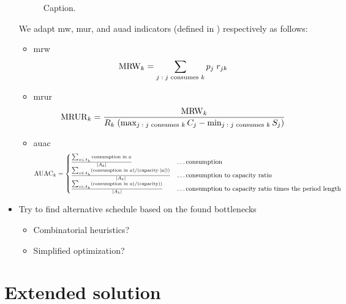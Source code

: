 \begin{itemize}
\begin{figure}[t]
      \caption{Caption.}
      \label{fig:MachineLoad}
    \end{figure}

    We adapt \ac{mw}, \ac{mur}, and \ac{auad} indicators (defined in ) respectively as follows:
    \begin{itemize}
        \item \ac{mrw}
        $$
        \operatorname{MRW}_{k} = \sum_{\substack{j \;:\; \text{$j$ consumes $k$}}} p_j \; r_{jk}
        $$

        \item \ac{mrur}
        $$
        \operatorname{MRUR}_{k} = \frac{\operatorname{MRW}_{k}}{R_k \; (\max_{j \;:\; \text{$j$ consumes $k$}} C_j - \min_{j \;:\; \text{$j$ consumes $k$}} S_j)}
        $$

        \item \ac{auac} 
        $$
        \operatorname{AUAC}_{k} = \begin{cases}
            \frac{\sum_{a \in A_k} \text{consumption in $a$}}{\left|{A_k}\right|} & \dots \text{consumption} \\
            \frac{\sum_{a \in A_k} (\text{consumption in $a$}) / (\text{capacity} \cdot \left|{a}\right|))}{\left|{A_k}\right|} & \dots \text{consumption to capacity ratio} \\
            \frac{\sum_{a \in A_k} (\text{consumption in $a$}) / (\text{capacity}))}{\left|{A_k}\right|} & \dots \text{consumption to capacity ratio times the period length}
            \end{cases}
        $$
    \end{itemize}

    \item Try to find alternative schedule based on the found bottlenecks
    \begin{itemize}
        \item Combinatorial heuristics?
        \item Simplified optimization?
    \end{itemize}
\end{itemize}

\section{Extended solution}

